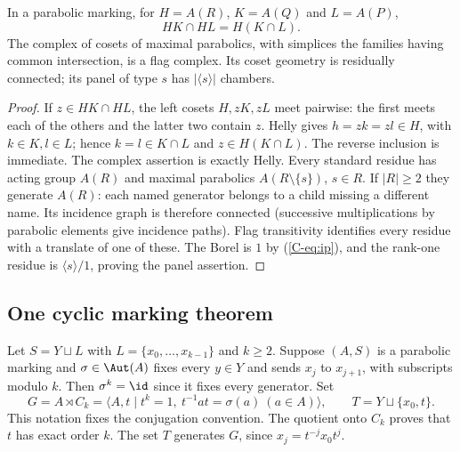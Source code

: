 \begin{lemma}\label{C-lem:product}
In a parabolic marking, for $H=A(R)$, $K=A(Q)$ and $L=A(P)$,
\[
 HK\cap HL=H(K\cap L).
\]
The complex of cosets of maximal parabolics, with simplices the families
having common intersection, is a flag complex. Its coset geometry is
residually connected; its panel of type $s$ has $|\langle s\rangle|$
chambers.
\end{lemma}
\begin{proof}
If $z\in HK\cap HL$, the left cosets $H,zK,zL$ meet pairwise:
the first meets each of the others and the latter two contain $z$.
Helly gives $h=zk=zl\in H$, with $k\in K,l\in L$; hence
$k=l\in K\cap L$ and $z\in H(K\cap L)$. The reverse inclusion
is immediate. The complex assertion is exactly Helly. Every standard
residue has acting group $A(R)$ and maximal parabolics
$A(R\setminus\{s\})$, $s\in R$. If $|R|\geq2$ they generate
$A(R)$: each named generator belongs to a child missing a different
name. Its incidence graph is therefore connected (successive
multiplications by parabolic elements give incidence paths). Flag
transitivity identifies every residue with a translate of one of these.
The Borel is $1$ by (\ref{C-eq:ip}), and the rank-one residue is
$\langle s\rangle/1$, proving the panel assertion.
\end{proof}

\subsection{One cyclic marking theorem}
Let $S=Y\sqcup L$ with
$L=\{x_0,\ldots,x_{k-1}\}$ and $k\geq2$. Suppose $(A,S)$ is a
parabolic marking and $\sigma\in\Aut(A)$ fixes every $y\in Y$ and
sends $x_j$ to $x_{j+1}$, with subscripts modulo $k$.
Then $\sigma^k=\id$ since it fixes every generator. Set
\[
 G=A\rtimes C_k=\langle A,t\mid t^k=1,\ t^{-1}at=\sigma(a)
 \ (a\in A)\rangle,
 \qquad T=Y\sqcup\{x_0,t\}.
\]
This notation fixes the conjugation convention. The quotient onto $C_k$
proves that $t$ has exact order $k$. The set $T$ generates $G$, since
$x_j=t^{-j}x_0t^j$.

